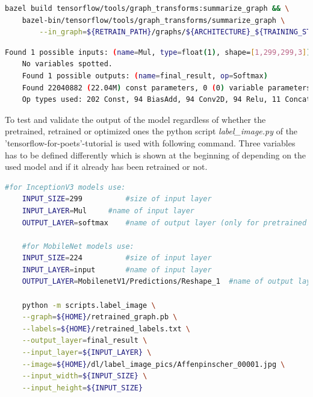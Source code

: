 \begin{minipage}{\linewidth}
\begin{lstlisting}[caption=Build and call of \textit{summarize_graph}, label=list:summarize_graph, language=bash]
	bazel build tensorflow/tools/graph_transforms:summarize_graph && \
	bazel-bin/tensorflow/tools/graph_transforms/summarize_graph \
		--in_graph=${RETRAIN_PATH}/graphs/${ARCHITECTURE}_${TRAINING_STEPS}/retrained_dog_graph_${ARCHITECTURE}_${TRAINING_STEPS}_${LEARNING_RATE}.pb
\end{lstlisting}
\end{minipage}

\begin{minipage}{\linewidth}
\begin{lstlisting}[caption=Output of \textit{summarize_graph} on a retrained and optimized InceptionV3 model, label=list:summarize_graph_out, language=bash]
	Found 1 possible inputs: (name=Mul, type=float(1), shape=[1,299,299,3]) 
	No variables spotted.
	Found 1 possible outputs: (name=final_result, op=Softmax) 
	Found 22040882 (22.04M) const parameters, 0 (0) variable parameters, and 0 control_edges
	Op types used: 202 Const, 94 BiasAdd, 94 Conv2D, 94 Relu, 11 Concat, 9 AvgPool, 5 MaxPool, 1 Add, 1 MatMul, 1 	Placeholder, 1 PlaceholderWithDefault, 1 Reshape, 1 Softmax
\end{lstlisting}
\end{minipage}



To test and validate the output of the model regardless of whether the pretrained, retrained or optimized ones the python script \textit{label\_image.py} of the 'tensorflow-for-poets'-tutorial is used with following command. Three variables has to be defined differently which is shown at the beginning of  depending on the used model and if it already has been retrained or not.

\begin{minipage}{\linewidth}
\begin{lstlisting}[caption=Call of \textit{label\_image.py}, label=list:label_image, language=bash]
	#for InceptionV3 models	use:
	INPUT_SIZE=299			#size of input layer
	INPUT_LAYER=Mul		#name of input layer
	OUTPUT_LAYER=softmax	#name of output layer (only for pretrained model otherwise 'final_result' or as defined in retrain-script)
	
	#for MobileNet models use:
	INPUT_SIZE=224			#size of input layer
	INPUT_LAYER=input	 	#name of input layer
	OUTPUT_LAYER=MobilenetV1/Predictions/Reshape_1	#name of output layer (only for pretrained model otherwise 'final_result' or as defined in retrain-script)

	python -m scripts.label_image \
	--graph=${HOME}/retrained_graph.pb \
	--labels=${HOME}/retrained_labels.txt \
	--output_layer=final_result \
	--input_layer=${INPUT_LAYER} \
	--image=${HOME}/dl/label_image_pics/Affenpinscher_00001.jpg \
	--input_width=${INPUT_SIZE} \
	--input_height=${INPUT_SIZE}
\end{lstlisting}
\end{minipage}

